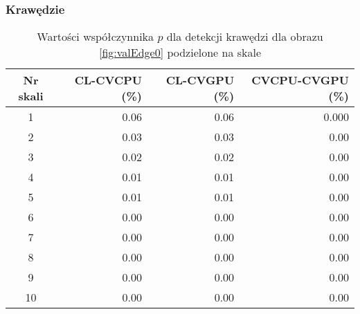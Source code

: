 \subsubsection{Krawędzie}
\label{subsubsec:krawedzieTabele}

\begin{center}
\begin{table}
\centering
\caption{Wartości współczynnika $ p $ dla detekcji krawędzi dla obrazu \ref{fig:valEdge0} podzielone na skale}
\label{tab:imageScaleEdge0}
\begin{tabular}{|c|r|r|r|}
 \hline
Nr skali & CL-CVCPU (\%) & CL-CVGPU (\%) & CVCPU-CVGPU (\%) \\ \hline
1        & 0.06     & 0.06     & 0.000       \\ \hline
2        & 0.03     & 0.03     & 0.00        \\ \hline
3        & 0.02     & 0.02     & 0.00        \\ \hline
4        & 0.01     & 0.01     & 0.00        \\ \hline
5        & 0.01     & 0.01     & 0.00        \\ \hline
6        & 0.00     & 0.00     & 0.00        \\ \hline
7        & 0.00     & 0.00     & 0.00        \\ \hline
8        & 0.00     & 0.00     & 0.00        \\ \hline
9        & 0.00     & 0.00     & 0.00        \\ \hline
10       & 0.00     & 0.00     & 0.00        \\ \hline
\end{tabular}
\end{table}
\end{center}

